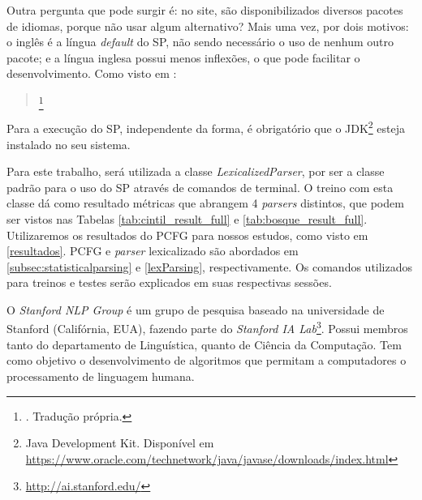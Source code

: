 Outra pergunta que pode surgir é: no site, são disponibilizados diversos pacotes de idiomas, porque não usar algum alternativo? Mais uma vez, por dois motivos: o inglês é a língua \textit{default} do SP, não sendo necessário o uso de nenhum outro pacote; e a língua inglesa possui menos inflexões, o que pode facilitar o desenvolvimento. Como visto em \cite[p~371]{Manning1999FoundationsNLP}:
\begin{quote}
    \footnote{. Tradução própria.}
\end{quote}

Para a execução do SP, independente da forma, é obrigatório que o JDK\footnote{Java Development Kit. Disponível em \url{https://www.oracle.com/technetwork/java/javase/downloads/index.html}} esteja instalado no seu sistema.

Para este trabalho, será utilizada a classe \textit{LexicalizedParser}, por ser a classe padrão para o uso do SP através de comandos de terminal. O treino com esta classe dá como resultado métricas que abrangem 4 \textit{parsers} distintos, que podem ser vistos nas Tabelas \ref{tab:cintil_result_full} e \ref{tab:bosque_result_full}. Utilizaremos os resultados do PCFG para nossos estudos, como visto em \ref{resultados}. PCFG e \textit{parser} lexicalizado são abordados em \ref{subsec:statisticalparsing} e \ref{lexParsing}, respectivamente.
Os comandos utilizados para treinos e testes serão explicados em suas respectivas sessões.

O \textit{Stanford NLP Group} é um grupo de pesquisa baseado na universidade de Stanford (Califórnia, EUA), fazendo parte do \textit{Stanford IA Lab}\footnote{\url{http://ai.stanford.edu/}}. Possui membros tanto do departamento de Linguística, quanto de Ciência da Computação. Tem como objetivo o desenvolvimento de algoritmos que permitam a computadores o processamento de linguagem humana. 

